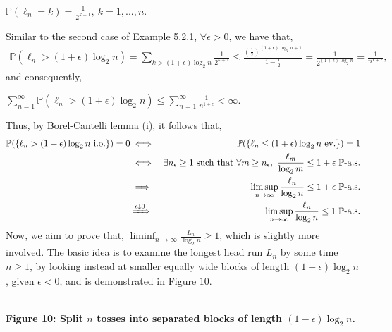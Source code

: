 \documentclass{article}
\begin{document}
\begin{center}
	$\mathbb{P}(\ell_n = k) = \frac{1}{2^{k+1}}, \ k = 1,...,n$.
\end{center}
Similar to the second case of Example 5.2.1, $\forall \epsilon > 0$, we have that,
\begin{eqnarray}
\nonumber
\mathbb{P}(\ell_n > (1+\epsilon)\log_2{n}) = \sum_{k > (1+\epsilon)\log_2{n}}\frac{1}{2^{k+1}} \leq \frac{(\frac{1}{2})^{(1+\epsilon)\log_2{n}+1}}{1 - \frac{1}{2}} = \frac{1}{2^{(1+\epsilon)\log_2{n}}} = \frac{1}{n^{1+\epsilon}},
\end{eqnarray}
and consequently,
\begin{center}
	$\sum_{n=1}^{\infty}\mathbb{P}(\ell_n > (1+\epsilon)\log_2{n}) \leq \sum_{n=1}^{\infty}\frac{1}{n^{1+\epsilon}} < \infty$.
\end{center}
Thus, by Borel-Cantelli lemma (i), it follows that,
\begin{eqnarray}
\nonumber
\mathbb{P}(\{\ell_n > (1+\epsilon)\log_2{n} \ \text{i.o.}\}) = 0 &\iff& \mathbb{P}(\{\ell_n \leq (1+\epsilon)\log_2{n} \ \text{ev.}\}) = 1 \\
\nonumber
&\iff& \exists n_\epsilon \geq 1 \ \text{such that} \ \forall m \geq n_\epsilon, \ \frac{\ell_m}{\log_2{m}} \leq 1+\epsilon \ \mathbb{P}\text{-a.s.} \\
\nonumber
&\implies& \limsup_{n\to\infty}\frac{\ell_n}{\log_2{n}} \leq 1 + \epsilon \ \mathbb{P}\text{-a.s.}\\
\nonumber
&\xRightarrow{\epsilon \downarrow 0}& \limsup_{n\to\infty}\frac{\ell_n}{\log_2{n}} \leq 1 \ \mathbb{P}\text{-a.s.}
\end{eqnarray}
Now, we aim to prove that, $\liminf_{n\to\infty}\frac{L_n}{\log_2{n}} \geq 1$, which is slightly more involved. The basic idea is to examine the longest head run $L_n$ by some time $n\geq1$, by looking instead at smaller equally wide blocks of length $(1-\epsilon)\log_2{n}$, given $\epsilon<0$, and is demonstrated in Figure $10$.
\begin{center}
\\
\textbf{Figure 10: Split $n$ tosses into separated blocks of length $(1-\epsilon)\log_2{n}$.}
\end{center}
\end{document}
